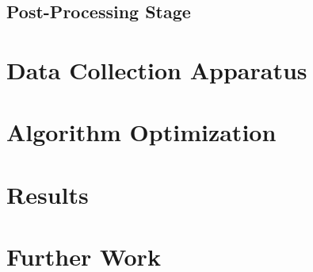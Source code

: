         \section{Post-Processing Stage}

    \chapter{Data Collection Apparatus}

    \chapter{Algorithm Optimization}

    \chapter{Results}

    \chapter{Further Work}